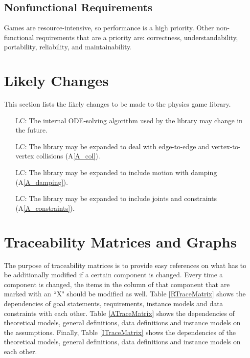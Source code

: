 \documentclass[12pt]{article}
\newcounter{lcnum} %
\begin{document}
\subsection{Nonfunctional Requirements}
Games are resource-intensive, so performance is a high priority.
Other non-functional requirements that are a priority are: correctness,
understandability, portability, reliability, and maintainability. 


%
%

\section{Likely Changes}    
\label{sec_likechan}

This section lists the likely changes to be made to the physics game library.

\begin{itemize}
	\item[LC\refstepcounter{lcnum}\thelcnum\label{LC_solver}:] The internal ODE-solving algorithm used by the library may change in the future.
	\item[LC\refstepcounter{lcnum}\thelcnum\label{LC_collisions}:] The library may be expanded to deal with edge-to-edge and vertex-to-vertex collisions (A\ref{A_col}).
	\item[LC\refstepcounter{lcnum}\thelcnum\label{LC_damping}:] The library may be expanded to include motion with damping (A\ref{A_damping}).
	\item[LC\refstepcounter{lcnum}\thelcnum\label{LC_constraints}:] The library may be expanded to include joints and constraints (A\ref{A_constraints}).
\end{itemize}


%
%

\section{Traceability Matrices and Graphs} \label{sec_tmag}

The purpose of traceability matrices is to provide easy references on what has to be additionally modified if a certain component is changed. Every time a component is changed, the items in the column of that component that are marked with an ``X" should be modified as well. Table \ref{RTraceMatrix} shows the dependencies of goal statements, requirements, instance models and data constraints with each other. Table \ref{ATraceMatrix} shows the dependencies of theoretical models, general definitions, data definitions and instance models on the assumptions. Finally, Table \ref{ITraceMatrix} shows the dependencies of the theoretical models, general definitions, data definitions and instance models on each other. \\
\end{document}
